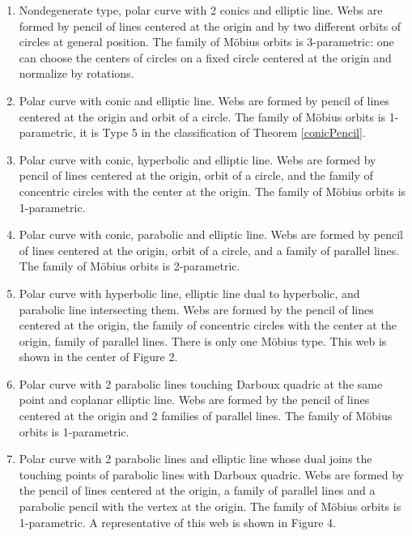 \documentclass[11pt,a4paper]{article}
\begin{document}
\bigskip
{}
\begin{enumerate}
\item Nondegenerate type, polar curve with 2 conics and elliptic line. Webs are formed by pencil of lines centered at the origin and by two different orbits of circles at general position.  The family of M\"obius orbits is 3-parametric: one can choose the centers of circles on a fixed circle centered at the origin and normalize by rotations.

\item Polar curve with conic and elliptic line. Webs are formed by pencil of lines centered at the origin and orbit of a circle.  The family of M\"obius orbits is 1-parametric, it is Type 5 in the classification of Theorem \ref{conicPencil}. 

\item Polar curve with conic,  hyperbolic and elliptic line. Webs are formed by pencil of lines centered at the origin, orbit of a circle, and the family of concentric circles with the center at the origin.  The family of M\"obius orbits is 1-parametric. 

\item Polar curve with conic,  parabolic and elliptic line. Webs are formed by pencil of lines centered at the origin, orbit of a circle, and a family of parallel lines.  The family of M\"obius orbits is 2-parametric. 

\item Polar curve with hyperbolic line, elliptic line dual to hyperbolic, and  parabolic line intersecting them. Webs are formed by the pencil of lines centered at the origin, the family of concentric circles with the center at the origin,  family of parallel lines.  There is only one M\"obius type. This web is shown in the center of Figure 2. 

\item Polar curve with 2  parabolic lines touching Darboux quadric  at the same point and coplanar elliptic line. Webs are formed by the pencil of lines centered at the origin and 2  families of parallel lines.  The family of M\"obius orbits is 1-parametric. 

\item Polar curve with 2  parabolic lines and elliptic line whose dual joins the touching points of parabolic lines with Darboux quadric. Webs are formed by the pencil of lines centered at the origin, a family of parallel lines and a parabolic pencil with the vertex at the origin.  The family of M\"obius orbits is 1-parametric. A representative of this web is shown in Figure 4.

\end{enumerate}
\end{document}
